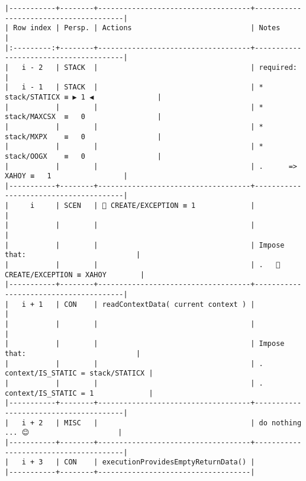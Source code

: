 \documentclass[varwidth=\maxdimen,margin=0.5cm,multi={verbatim}]{standalone}
\begin{document}
\begin{verbatim}
|-----------+--------+------------------------------------+---------------------------------------|
| Row index | Persp. | Actions                            | Notes                                 |
|:---------:+--------+------------------------------------+---------------------------------------|
|   i - 2   | STACK  |                                    | required:                             |
|   i - 1   | STACK  |                                    | * stack/STATICX ≡ ▶ 1 ◀               |
|           |        |                                    | * stack/MAXCSX  ≡   0                 |
|           |        |                                    | * stack/MXPX    ≡   0                 |
|           |        |                                    | * stack/OOGX    ≡   0                 |
|           |        |                                    | .      => XAHOY ≡   1                 |
|-----------+--------+------------------------------------+---------------------------------------|
|     i     | SCEN   |  CREATE/EXCEPTION ≡ 1             |                                       |
|           |        |                                    |                                       |
|           |        |                                    | Impose that:                          |
|           |        |                                    | .    CREATE/EXCEPTION ≡ XAHOY        |
|-----------+--------+------------------------------------+---------------------------------------|
|   i + 1   | CON    | readContextData( current context ) |                                       |
|           |        |                                    |                                       |
|           |        |                                    | Impose that:                          |
|           |        |                                    | .   context/IS_STATIC = stack/STATICX |
|           |        |                                    | .   context/IS_STATIC = 1             |
|-----------+--------+------------------------------------+---------------------------------------|
|   i + 2   | MISC   |                                    | do nothing ... 😊                     |
|-----------+--------+------------------------------------+---------------------------------------|
|   i + 3   | CON    | executionProvidesEmptyReturnData() |
|-----------+--------+------------------------------------|

\end{verbatim}
\end{document}
